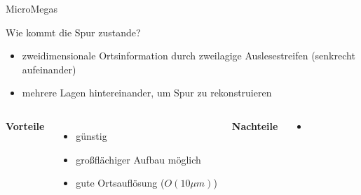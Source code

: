 \begin{frame}{MicroMegas}

	\begin{block}{Wie kommt die Spur zustande?}
		\begin{itemize}
		  \item zweidimensionale Ortsinformation durch zweilagige Auslesestreifen (senkrecht aufeinander)
		  \item mehrere Lagen hintereinander, um Spur zu rekonstruieren
		\end{itemize}
	\end{block}
	\vspace{0.8cm}
    \begin{columns}[T]
			\textbf{Vorteile}		
			\begin{itemize}
			  \item günstig
			  \item großflächiger Aufbau möglich
			  \item gute Ortsauflösung ($O(10\mu m)$)
			\end{itemize}	
	    	\textbf{Nachteile}
	    	\begin{itemize}
			  \item 
			\end{itemize}
    \end{columns}
    \vspace{1cm}
\end{frame}
